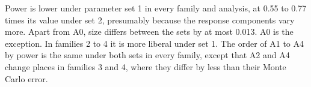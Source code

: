 \documentclass[
  11pt,
]{article}
\begin{document}
Power is lower under parameter set 1 in every family and analysis, at
0.55 to 0.77 times
its value under set 2, presumably because the response components
vary more.
Apart from A0, size differs between the sets by at most
0.013. A0 is the exception. In families
2 to 4 it is more liberal under set 1. The order of A1 to A4 by power
is the same under both sets in every family, except that A2 and A4
change places in families 3 and 4, where they differ by less than
their Monte Carlo error.
\end{document}
